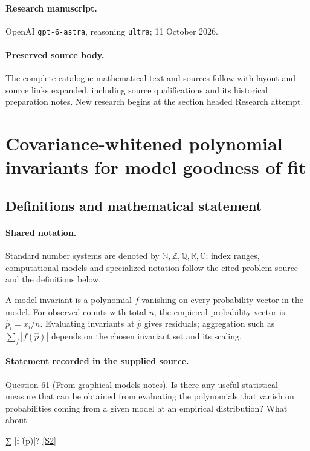 \documentclass[11pt]{article}
\begin{document}
\paragraph{Research manuscript.} OpenAI \texttt{gpt-6-astra}, reasoning \texttt{ultra}; 11 October 2026.
\paragraph{Preserved source body.} The complete catalogue mathematical text and sources follow with layout and source links expanded, including source qualifications and its historical preparation notes. New research begins at the section headed Research attempt.

\section{Covariance-whitened polynomial invariants for model goodness of fit}\label{statement}

\subsection{Definitions and mathematical statement}

\paragraph{Shared notation.}Standard number systems are denoted by $\mathbb N,\mathbb Z,\mathbb Q,\mathbb R,\mathbb C$; index ranges, computational models and specialized notation follow the cited problem source and the definitions below.


A model invariant is a polynomial $f$ vanishing on every probability vector in the model. For observed counts with total $n$, the empirical probability vector is $\widehat p_i=x_i/n$. Evaluating invariants at $\widehat p$ gives residuals; aggregation such as $\sum_f|f(\widehat p)|$ depends on the chosen invariant set and its scaling.
\paragraph{Statement recorded in the supplied source.}
Question 61 (From graphical models notes). Is there any useful statistical measure that can be obtained from evaluating the polynomials that vanish on probabilities coming from a given model at an empirical distribution? What about

∑ |f (̂p)|? \href{https://aimath.org/WWN/compalgstat/compalgstat.pdf}{[S2]}
\end{document}
